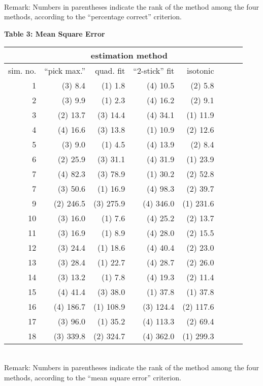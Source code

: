 \begin{table}[htb]
\mbox{}\\ {\footnotesize Remark:  Numbers in parentheses
indicate the rank of the method among the four methods,
according to the ``percentage correct'' criterion.}

\end{table}

\begin{table}[htb]
\begin{centre}
{\bf Table 3:  Mean Square Error}\\[0.5cm]

\begin{tabular} {| r | r | r | r | r | r | r | r |} \hline
         & \multicolumn{4}{c|}{ estimation method } \\ \hline
sim. no. & ``pick max.'' & quad. fit & ``2-stick'' fit & isotonic \\ \hline
1 &  (3) 8.4   &  (1) 1.8   & (4) 10.5   &  (2) 5.8   \\ \hline
2 &  (3) 9.9   &  (1) 2.3   & (4) 16.2   &  (2) 9.1   \\ \hline
3 & (2) 13.7   & (3) 14.4   & (4) 34.1   & (1) 11.9   \\ \hline
4 & (4) 16.6   & (3) 13.8   & (1) 10.9   & (2) 12.6   \\ \hline
5 &  (3) 9.0   &  (1) 4.5   & (4) 13.9   &  (2) 8.4   \\ \hline
6 & (2) 25.9   & (3) 31.1   & (4) 31.9   & (1) 23.9   \\ \hline
7 &  (4) 82.3  &  (3) 78.9  &  (1) 30.2  &  (2) 52.8  \\ \hline
7 &  (3) 50.6  &  (1) 16.9  &  (4) 98.3  &  (2) 39.7  \\ \hline
9 & (2) 246.5  & (3) 275.9  & (4) 346.0  & (1) 231.6  \\ \hline
10 & (3) 16.0   &  (1) 7.6   & (4) 25.2   & (2) 13.7   \\ \hline
11 & (3) 16.9   &  (1) 8.9   & (4) 28.0   & (2) 15.5   \\ \hline
12 & (3) 24.4   & (1) 18.6   & (4) 40.4   & (2) 23.0   \\ \hline
13 & (3) 28.4   & (1) 22.7   & (4) 28.7   & (2) 26.0   \\ \hline
14 & (3) 13.2   &  (1) 7.8   & (4) 19.3   & (2) 11.4   \\ \hline
15 & (4) 41.4   & (3) 38.0   & (1) 37.8   & (1) 37.8   \\ \hline
16 & (4) 186.7  & (1) 108.9  & (3) 124.4  & (2) 117.6  \\ \hline
17 &  (3) 96.0  &  (1) 35.2  & (4) 113.3  &  (2) 69.4  \\ \hline
18 & (3) 339.8  & (2) 324.7  & (4) 362.0  & (1) 299.3  \\ \hline
\end{tabular} 
\end{centre}

\mbox{}\\ {\footnotesize Remark:  Numbers in parentheses
indicate the rank of the method among the four methods,
according to the ``mean square error'' criterion.}

\end{table}

